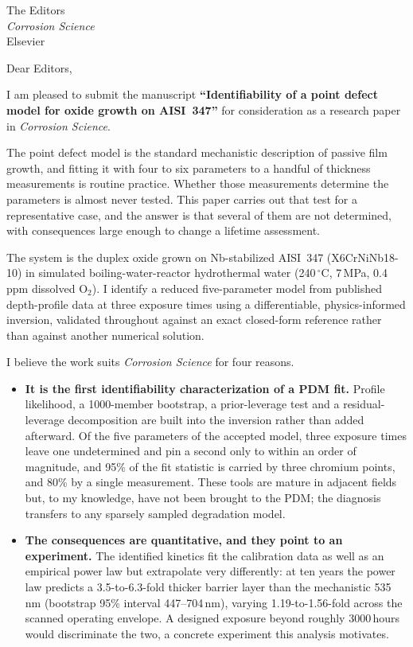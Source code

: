 \documentclass[11pt]{letter}
\begin{document}
\setlength{\parskip}{0.4ex}

\begin{letter}{The Editors \\ \textit{Corrosion Science} \\ Elsevier}

\opening{Dear Editors,}

I am pleased to submit the manuscript \textbf{``Identifiability of a
point defect model for oxide growth on AISI~347''} for consideration as
a research paper in \textit{Corrosion Science}.

The point defect model is the standard mechanistic description of
passive film growth, and fitting it with four to six parameters to a
handful of thickness measurements is routine practice. Whether those
measurements determine the parameters is almost never tested. This
paper carries out that test for a representative case, and the answer
is that several of them are not determined, with consequences large enough to change a lifetime assessment.

The system is the duplex oxide grown on Nb-stabilized AISI~347
(X6CrNiNb18-10) in simulated boiling-water-reactor hydrothermal water
(240\,$^\circ$C, 7\,MPa, 0.4\,ppm dissolved O$_2$). I identify a reduced
five-parameter model from published depth-profile data at three exposure
times using a differentiable, physics-informed inversion, validated
throughout against an exact closed-form reference rather than against
another numerical solution.

I believe the work suits \textit{Corrosion Science} for four reasons.

\begin{itemize}
\item \textbf{It is the first identifiability characterization of a PDM
fit.} Profile likelihood, a 1000-member bootstrap, a prior-leverage test
and a residual-leverage decomposition are built into the inversion
rather than added afterward. Of the five parameters of the accepted
model, three exposure times leave one undetermined and pin a second only
to within an order of magnitude, and 95\% of the fit statistic is
carried by three chromium points, and 80\% by a single measurement. These
tools are mature in adjacent fields but, to my knowledge, have not been
brought to the PDM; the diagnosis transfers to any sparsely sampled
degradation model.

\item \textbf{The consequences are quantitative, and they point to an experiment.} The
identified kinetics fit the calibration data as well as an empirical
power law but extrapolate very differently: at ten years the power law
predicts a 3.5-to-6.3-fold thicker barrier layer than the mechanistic
535\,nm (bootstrap 95\% interval 447--704\,nm), varying
1.19-to-1.56-fold across the scanned operating envelope. A designed
exposure beyond roughly 3000\,hours would discriminate the two, a concrete experiment this analysis motivates.


\end{itemize}
\end{letter}
\end{document}
